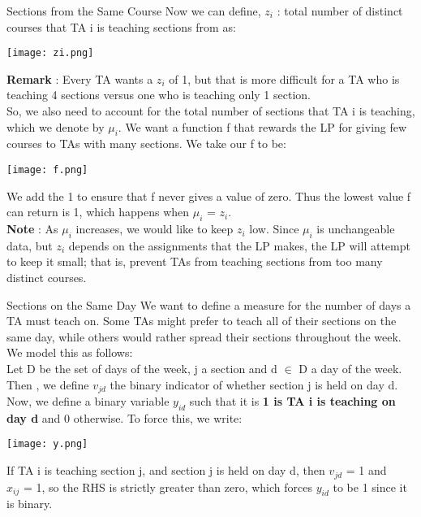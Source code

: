 \documentclass[9pt]{beamer}
\begin{document}
\begin{frame}{Sections from the Same Course}
Now we can define, $ z_i $ : total number of distinct courses that TA i is teaching sections from as:\\
\begin{center}
\texttt{[image: zi.png]}\\
\end{center}
\pause
\textbf{Remark} : Every TA wants a $ z_i $ of 1, but that is more difficult for a TA who is teaching 4 sections versus one who is teaching only 1 section. \\
\vspace{0.15cm}
\pause
So, we also need to account for the total number of sections that TA i is teaching, which we denote by $ \mu_i $. We want a function f that rewards the LP for giving few courses to TAs with many sections. We take our f to be:\\ 
\begin{center}
\texttt{[image: f.png]}\\
\end{center}
We add the 1 to ensure that f never gives a value of zero. Thus the lowest value f can return is 1, which happens when $ \mu_i $ = $ z_i $.\\ 
\vspace{0.1cm}
\pause
\textbf{Note} : As $ \mu_i $ increases, we would like to keep $ z_i $ low. Since $ \mu_i $ is unchangeable data, but $ z_i $ depends on the assignments that the LP makes, the LP will attempt to keep it small; that is, prevent TAs from teaching sections from too many distinct courses.
\end{frame} 

\begin{frame}{Sections on the Same Day}
We want to define a measure for the number of days a TA must teach on. Some TAs might prefer to teach all of their sections on the same day, while others would rather spread their sections throughout the week. We model this as follows:\\
\vspace{0.1cm}
\pause
Let D be the set of days of the week, j a section and d $ \in $ D a day of the week. Then , we define $ v_{jd} $ the binary indicator of whether section j is held on day d.\\
\vspace{0.1cm}
\pause
Now, we define a binary variable $ y_{id} $ such that it is \textbf{1 is TA i is teaching on day d} and 0 otherwise. To force this, we write:\\
\begin{center}
    \texttt{[image: y.png]}\\
\end{center}
\pause
If TA i is teaching section j, and section j is held on day d, then $ v_{jd} $ = 1 and \\ $ x_{ij} $ = 1, so the RHS is strictly greater than zero, which forces $ y_{id} $ to be 1 since it is binary.\\
\end{frame} 
\end{document}
